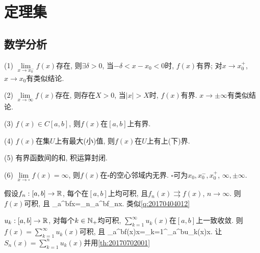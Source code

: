 \chapter{定理集}
\section{数学分析}
(1) $\lim\limits_{x\to x_0^{-}}f(x)$存在, 则$\exists\delta>0$, 当$-\delta<x-x_0<0$时, $f(x)$有界; 对$x\to x_0^+$, $x\to x_0$有类似结论.

(2) $\lim\limits_{x\to\infty}f(x)$存在, 则存在$X>0$, 当$|x|>X$时, $f(x)$有界. $x\to\pm\infty$有类似结论.

(3) $f(x)\in C[a,b]$, 则$f(x)$在$[a,b]$上有界.

(4) $f(x)$在集$U$上有最大(小)值, 则$f(x)$在$U$上有上(下)界.

(5) 有界函数间的和, 积运算封闭.

(6) $\lim\limits_{x\to\square}f(x)=\infty$, 则$f(x)$在$\square$的空心邻域内无界. $\square$可为$x_0, x_0^-, x_0^+$, $\infty, \pm\infty$.
\et

假设$f_n: [a,b]\to\Bbb R$, 每个在$[a,b]$上均可积, 且$f_n(x)\rightrightarrows f(x)$, $n\to\infty$.
则$f(x)$可积, 且
\bee
\int_a^bf\ud x=\lim_{n\to\infty}\int_a^bf_n\ud x.
\eee
\et
\ba
类似\ref{q:20170404012}
\ea

$u_k: [a,b]\to\Bbb R$, 对每个$k\in\Bbb N_+$均可积, $\sum_{k=1}^{\infty}u_k(x)$在$[a,b]$上一致收敛.
则$f(x)=\sum_{k=1}^{\infty}u_k(x)$可积, 且
\bee
\int_a^bf(x)\ud x=\sum_{k=1}^{\infty}\int_a^bu_k(x)\ud x.
\eee
\et
\ba
让$S_n(x)=\sum_{k=1}^nu_k(x)$并用\ref{th:20170702001}
\ea

